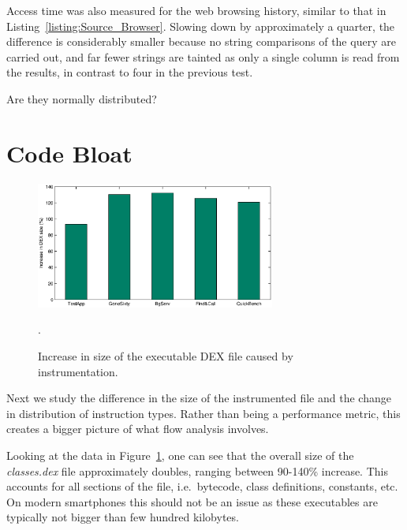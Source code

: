 \documentclass[12pt,twoside,notitlepage]{report}
\begin{document}
Access time was also measured for the web browsing history, similar to that in Listing~\ref{listing:Source_Browser}. Slowing down by approximately a quarter, the difference is considerably smaller because no string comparisons of the query are carried out, and far fewer strings are tainted as only a single column is read from the results, in contrast to four in the previous test.

Are they normally distributed?

\section{Code Bloat}

\begin{figure}
	\centerline{
		\includegraphics[width=0.7\textwidth]{figs/fig_eval_filesize.eps}
	}
	\caption{Increase in size of the executable DEX file caused by instrumentation.}.
	\label{figure:Evalutaion_FileSize}
\end{figure}

Next we study the difference in the size of the instrumented file and the change in distribution of instruction types. Rather than being a performance metric, this creates a bigger picture of what flow analysis involves.

Looking at the data in Figure~\ref{figure:Evalutaion_FileSize}, one can see that the overall size of the \emph{classes.dex} file approximately doubles, ranging between 90-140\% increase. This accounts for all sections of the file, i.e.\ bytecode, class definitions, constants, etc. On modern smartphones this should not be an issue as these executables are typically not bigger than few hundred kilobytes.
\end{document}
